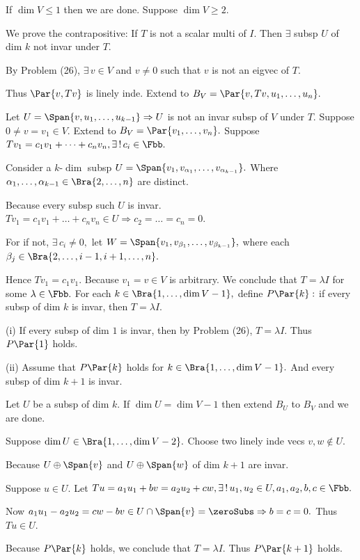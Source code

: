 If $\dim V\leqslant 1$ then we are done. Suppose $\dim V\geqslant 2.$\par\quad
We prove the contrapositive: {\tgsl If $T$ is not a scalar multi of $I$. Then $\exists$ subsp $U$ of dim $k$ not invar under $T.$}\par\quad
By Problem (26), $\exists\,v\in V$ and $v\neq 0$ such that $v$ is not an eigvec of $T.$\par\quad
Thus $\Par{v,Tv}$ is linely inde. Extend to $B_V=\Par{v,Tv,u_1,\dots,u_n}.$\par\quad
Let $U=\Span{v,u_1,\dots,u_{k-1}}\Rightarrow U$ is not an invar subsp of $V$ under $T.$\PfEnd\vspace{6pt}\quad
\Or Suppose $0\neq v=v_1\in V.$ Extend to $B_V=\Par{v_1,\dots,v_n}.$ Suppose $Tv_1=c_1 v_1+\dots+c_n v_n,\exists\,!\,c_i\in\Fbb.$\par\quad
Consider a $k$\hspace{1pt}-\hspace{1pt}$\dim$ subsp $U=\Span{v_1,v_{\alpha_1},\dots,v_{\alpha_{k-1}}}.$ Where $\alpha_1,\dots,\alpha_{k-1}\in\Bra{2,\dots,n}$ are distinct.\par\quad
Because every subsp such $U$ is invar. $Tv_1=c_1 v_1+\dots+c_n v_n\in U\Longrightarrow c_2=\dots=c_n=0.$\vspace{0pt}\par\quad
For if not, $\exists\,c_i\neq 0,$ let $W=\Span{v_1,v_{\beta_1},\dots,v_{\beta_{k-1}}},$ where each $\beta_j\in\Bra{{2,\dots,i-1,i+1,\dots,n}}.$\par\quad
Hence $Tv_1=c_1 v_1.$ Because $v_1=v\in V$ is arbitrary. We conclude that $T=\lambda I$ for some $\lambda\in\Fbb.$\PfEnd\vspace{6pt}\quad
\Or For each $k\in\Bra{1,\dots,\dim V-1},$ define $P\Par{k}:$ if every subsp of dim $k$ is invar, then $T=\lambda I.$\par\quad
(i) If every subsp of dim $1$ is invar, then by Problem (26), $T=\lambda I.$ Thus $P\Par{1}$ holds.\par\quad\Endi
(ii) Assume that $P\Par{k}$ holds for $k\in\Bra{1,\dots,\dim V-1}.$ And every subsp of dim $k+1$ is invar.\par\quad\Hii
Let $U$ be a subsp of dim $k.$ If $\dim U=\dim V-1$ then extend $B_U$ to $B_V$ and we are done.\par\quad\Hii
Suppose $\dim U\in\Bra{1,\dots,\dim V-2}.$ Choose two linely inde vecs $v,w\not\in U.$\par\quad\Hii
Because $U\oplus\Span{v}$ and $U\oplus\Span{w}$ of dim $k+1$ are invar.\par\quad\Hii
Suppose $u\in U.$ Let $Tu=a_1u_1+bv=a_2u_2+cw,\exists\,!\,u_1,u_2\in U,a_1,a_2,b,c\in\Fbb.$\par\quad\Hii
Now $a_1u_1-a_2u_2=cw-bv\in U\cap\Span{v}=\zeroSubs\Rightarrow b=c=0.$ Thus $Tu\in U.$\par\quad\Hii
Because $P\Par{k}$ holds, we conclude that $T=\lambda I.$ Thus $P\Par{k+1}$ holds.\PfEnd
\SepLine

